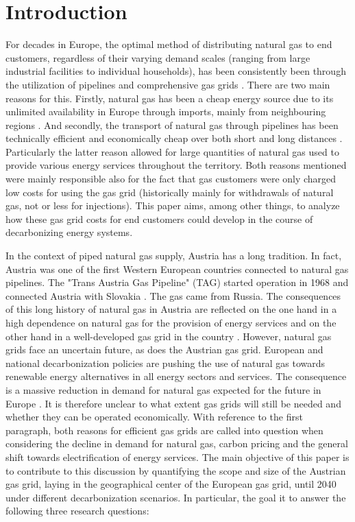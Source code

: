 \section{Introduction}
For decades in Europe, the optimal method of distributing natural gas to end customers, regardless of their varying demand scales (ranging from large industrial facilities to individual households), has been consistently been through the utilization of pipelines and comprehensive gas grids \cite{rajnauth2008gas}. There are two main reasons for this. Firstly, natural gas has been a cheap energy source due to its unlimited availability in Europe through imports, mainly from neighbouring regions \cite{bilgin2009geopolitics}. And secondly, the transport of natural gas through pipelines has been technically efficient and economically cheap over both short and long distances \cite{thomas2003review}. Particularly the latter reason allowed for large quantities of natural gas used to provide various energy services throughout the territory. Both reasons mentioned were mainly responsible also for the fact that gas customers were only charged low costs for using the gas grid (historically mainly for withdrawals of natural gas, not or less for injections). This paper aims, among other things, to analyze how these gas grid costs for end customers could develop in the course of decarbonizing energy systems.\vspace{0.3cm}
 
In the context of piped natural gas supply, Austria has a long tradition. In fact, Austria was one of the first Western European countries connected to natural gas pipelines. The "Trans Austria Gas Pipeline" (TAG) started operation in 1968 and connected Austria with Slovakia \cite{gas_connect_austria}. The gas came from Russia. The consequences of this long history of natural gas in Austria are reflected on the one hand in a high dependence on natural gas for the provision of energy services \cite{eurostat_natural_gas} and on the other hand in a well-developed gas grid in the country \cite{econtrol_grid}. However, natural gas grids face an uncertain future, as does the Austrian gas grid. European and national decarbonization policies are pushing the use of natural gas towards renewable energy alternatives in all energy sectors and services. The consequence is a massive reduction in demand for natural gas expected for the future in Europe \cite{repowereu}. It is therefore unclear to what extent gas grids will still be needed and whether they can be operated economically. With reference to the first paragraph, both reasons for efficient gas grids are called into question when considering the decline in demand for natural gas, carbon pricing and the general shift towards electrification of energy services. The main objective of this paper is to contribute to this discussion by quantifying the scope and size of the Austrian gas grid, laying in the geographical center of the European gas grid, until 2040 under different decarbonization scenarios. In particular, the goal it to answer the following three research questions:

